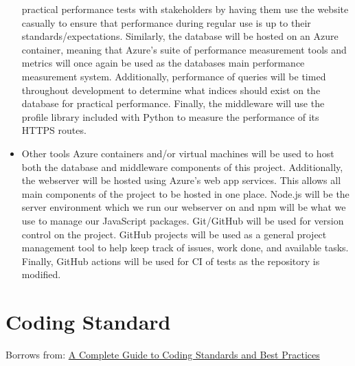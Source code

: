 \documentclass{article}
\begin{document}
\begin{itemize}
practical performance tests with stakeholders by having them use the website 
casually to ensure that performance during regular use is up to their
standards/expectations.
\subitem Similarly, the database will be hosted on an Azure container, meaning 
that Azure's suite of performance measurement tools and metrics will once again 
be used as the databases main performance measurement system. Additionally, 
performance of queries will be timed throughout development to determine what 
indices should exist on the database for practical performance.
\subitem Finally, the middleware will use the profile library included with 
Python to measure the performance of its HTTPS routes.
\item Other tools
\subitem Azure containers and/or virtual machines will be used to host both the 
database and middleware components of this project. Additionally, the webserver 
will be hosted using Azure's web app services. This allows all main components 
of the project to be hosted in one place.
\subitem Node.js will be the server environment which we run our webserver on 
and npm will be what we use to manage our JavaScript 
packages.
\subitem Git/GitHub will be used for version control on the project. GitHub 
projects will be used as a general project management tool to help keep 
track of issues, work done, and available tasks. Finally, GitHub actions will 
be used for CI of tests as the repository is modified.
\end{itemize}

\section{Coding Standard}

Borrows from: \newline
\href{https://www.lambdatest.com/learning-hub/coding-standards}{A Complete Guide to Coding Standards and Best Practices}
\newline
\end{document}
